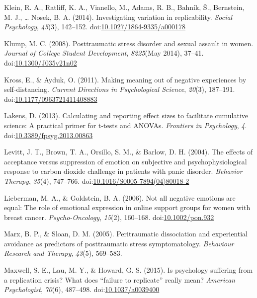 \documentclass[man]{apa6}
\theoremstyle{definition}
\theoremstyle{definition}
\theoremstyle{definition}
\theoremstyle{remark}
\begin{document}
\hypertarget{ref-Klein2014a}{}
Klein, R. A., Ratliff, K. A., Vianello, M., Adams, R. B., Bahník, Š.,
Bernstein, M. J., \ldots{} Nosek, B. A. (2014). Investigating variation
in replicability. \emph{Social Psychology}, \emph{45}(3), 142--152.
doi:\href{https://doi.org/10.1027/1864-9335/a000178}{10.1027/1864-9335/a000178}

\hypertarget{ref-Klump2008}{}
Klump, M. C. (2008). Posttraumatic stress disorder and sexual assault in
women. \emph{Journal of College Student Development}, \emph{8225}(May
2014), 37--41.
doi:\href{https://doi.org/10.1300/J035v21n02}{10.1300/J035v21n02}

\hypertarget{ref-Kross2011}{}
Kross, E., \& Ayduk, O. (2011). Making meaning out of negative
experiences by self-distancing. \emph{Current Directions in
Psychological Science}, \emph{20}(3), 187--191.
doi:\href{https://doi.org/10.1177/0963721411408883}{10.1177/0963721411408883}

\hypertarget{ref-Lakens2013}{}
Lakens, D. (2013). Calculating and reporting effect sizes to facilitate
cumulative science: A practical primer for t-tests and ANOVAs.
\emph{Frontiers in Psychology}, \emph{4}.
doi:\href{https://doi.org/10.3389/fpsyg.2013.00863}{10.3389/fpsyg.2013.00863}

\hypertarget{ref-Levitt2004}{}
Levitt, J. T., Brown, T. A., Orsillo, S. M., \& Barlow, D. H. (2004).
The effects of acceptance versus suppression of emotion on subjective
and psychophysiological response to carbon dioxide challenge in patients
with panic disorder. \emph{Behavior Therapy}, \emph{35}(4), 747--766.
doi:\href{https://doi.org/10.1016/S0005-7894(04)80018-2}{10.1016/S0005-7894(04)80018-2}

\hypertarget{ref-Lieberman2006}{}
Lieberman, M. A., \& Goldstein, B. A. (2006). Not all negative emotions
are equal: The role of emotional expression in online support groups for
women with breast cancer. \emph{Psycho-Oncology}, \emph{15}(2),
160--168. doi:\href{https://doi.org/10.1002/pon.932}{10.1002/pon.932}

\hypertarget{ref-Marx2005}{}
Marx, B. P., \& Sloan, D. M. (2005). Peritraumatic dissociation and
experiential avoidance as predictors of posttraumatic stress
symptomatology. \emph{Behaviour Research and Therapy}, \emph{43}(5),
569--583.

\hypertarget{ref-Maxwell2015}{}
Maxwell, S. E., Lau, M. Y., \& Howard, G. S. (2015). Is psychology
suffering from a replication crisis? What does ``failure to replicate''
really mean? \emph{American Psychologist}, \emph{70}(6), 487--498.
doi:\href{https://doi.org/10.1037/a0039400}{10.1037/a0039400}
\end{document}

